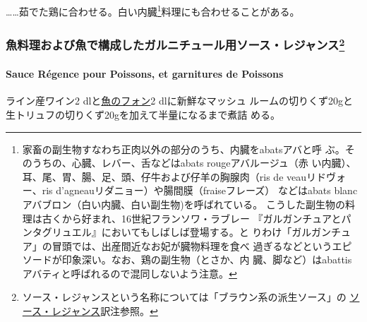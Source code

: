 \begin{recette}
\ldots{}\ldots{}茹でた鶏に合わせる。白い内臓\footnote{家畜の副生物すなわち正肉以外の部分のうち、内臓をabatsアバと呼
  ぶ。そのうちの、心臓、レバー、舌などはabats rougeアバルージュ（赤
  い内臓）、耳、尾、胃、腸、足、頭、仔牛および仔羊の胸腺肉（ris de
  veauリドヴォー、ris d'agneauリダニョー）や腸間膜（fraiseフレーズ）
  などはabats blancアバブロン（白い内臓、白い副生物)を呼ばれている。
  こうした副生物の料理は古くから好まれ、16世紀フランソワ・ラブレー
  『ガルガンチュアとパンタグリュエル』においてもしばしば登場する。と
  りわけ「ガルガンチュア」の冒頭では、出産間近なお妃が臓物料理を食べ
  過ぎるなどというエピソードが印象深い。なお、鶏の副生物（とさか、内
  臓、脚など）はabattisアバティと呼ばれるので混同しないよう注意。}料理にも合わせることがある。

\maeaki

\hypertarget{ux9b5aux6599ux7406ux304aux3088ux3073ux9b5aux3067ux69cbux6210ux3057ux305fux30acux30ebux30cbux30c1ux30e5ux30fcux30ebux7528ux30bdux30fcux30b9ux30ecux30b8ux30e3ux30f3ux30b9119}{%
\subsubsection[魚料理および魚で構成したガルニチュール用ソース・レジャンス]{\texorpdfstring{魚料理および魚で構成したガルニチュール用ソース・レジャンス\footnote{ソース・レジャンスという名称については「ブラウン系の派生ソース」の
  \protect\hyperlink{sauce-regence}{ソース・レジャンス}訳注参照。}}{魚料理および魚で構成したガルニチュール用ソース・レジャンス}}\label{ux9b5aux6599ux7406ux304aux3088ux3073ux9b5aux3067ux69cbux6210ux3057ux305fux30acux30ebux30cbux30c1ux30e5ux30fcux30ebux7528ux30bdux30fcux30b9ux30ecux30b8ux30e3ux30f3ux30b9119}}

\hypertarget{sauce-ruxe9gence-pour-poissons-et-garnitures-de-poissons}{%
\paragraph{Sauce Régence pour Poissons, et garnitures de
Poissons}\label{sauce-ruxe9gence-pour-poissons-et-garnitures-de-poissons}}


ライン産ワイン2 dlと\protect\hyperlink{fumet-de-poisson}{魚のフォン}2
dlに新鮮なマッシュ
ルームの切りくず20gと生トリュフの切りくず20gを加えて半量になるまで煮詰
める。


\end{recette}
